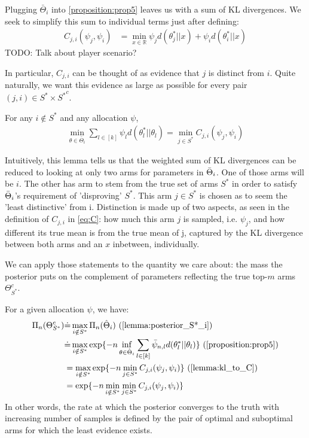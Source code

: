 Plugging $\bar{\Theta}_i$ into \ref{proposition:prop5} leaves us with a sum of KL divergences. We seek to simplify this sum to individual terms just after defining:
\begin{align}
  C_{j, i}(\psi_j,\psi_i) &=  \min_{x \in \mathbb{R}} \psi_j d(\theta^*_{j} || x) + \psi_i d(\theta_{i}^* ||x) \label{eq:C}
\end{align}
TODO: Talk about player scenario?

In particular, $C_{j, i}$ can be thought of as evidence that $j$ is distinct from $i$. Quite naturally, we want this evidence as large as possible for every pair $(j, i) \in S^* \times {S^*}^c$.

\begin{lemma}\label{lemma:kl_to_C}
  For any $i \notin S^*$ and any allocation $\psi$,
  \begin{align}
    \min_{\theta \in \bar{\Theta}_i} \sum_{l \in [k]}\psi_l d(\theta^*_l||\theta_l) = \min_{j \in S^*} C_{j, i}(\psi_j, \psi_i)
  \end{align}
\end{lemma}

Intuitively, this lemma tells us that the weighted sum of KL divergences can be reduced to looking at only two arms for parameters in $\Bar{\Theta}_i$. One of those arms will be $i$. The other has arm to stem from the true set of arms $S^*$ in order to satisfy $\Bar{\Theta}_i$'s requirement of 'disproving' $S^*$. This arm $j \in S^*$ is chosen as to seem the 'least distinctive' from i. Distinction is made up of two aspects, as seen in the definition of $C_{j, i}$ in \eqref{eq:C}: how much this arm $j$ is sampled, i.e. $\psi_j$, and how different its true mean is from the true mean of j, captured by the KL divergence between both arms and an $x$ inbetween, individually.

We can apply those statements to the quantity we care about: the mass the posterior puts on the complement of parameters reflecting the true top-$m$ arms $\Theta_{S^*}^c$.

For a given allocation $\psi$, we have:
\begin{align}
  \Pi_n(\Theta_{S^*}^c) &\deq \max_{i \notin S^*}\Pi_n(\hat{\Theta}_i) \text{ (\Cref{lemma:posterior_S*_i})}\\
    &\deq \max_{i \notin S^*} \exp\{-n\inf_{\theta \in \hat{\Theta}_i} \sum_{l \in [k]} \bar{\psi}_{n, l} d(\theta^*_l || \theta_l)\} \text{ (\Cref{proposition:prop5})} \\
    &= \max_{i \notin S^*} \exp\{-n \min_{j \in S^*} C_{j, i}(\psi_j, \psi_i)\} \text{ (\Cref{lemma:kl_to_C})} \\
    &= \exp\{-n \min_{i \notin S^*}\min_{j \in S^*} C_{j, i}(\psi_j, \psi_i)\} \label{eq:posterior}
\end{align}
In other words, the rate at which the posterior converges to the truth with increasing number of samples is defined by the pair of optimal and suboptimal arms for which the least evidence exists.

